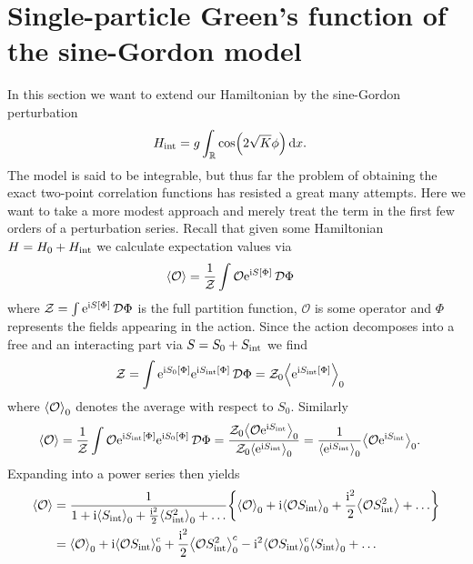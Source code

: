 \documentclass[english, parskip=full]{scrartcl}
\begin{document}
\section{Single-particle Green's function of the sine-Gordon model}
In this section we want to extend our Hamiltonian by the sine-Gordon perturbation
\begin{align}
H_\Text{int} &= g\intr{\cos\kla*{2\sqrt{K} \phi}}{x}.
\end{align}
The model is said to be integrable, but thus far the problem of obtaining the exact two-point correlation functions has resisted a great many attempts.
Here we want to take a more modest approach and merely treat the term in the first few orders of a perturbation series.
Recall that given some Hamiltonian $H=H_0+H_\Text{int}$ we calculate expectation values via
\begin{align}
\bra*{\mathcal{O}} &= \frac{1}{\mathcal{Z}} \int \mathcal{O} \powe{\i S[\Phi]}\,\mathcal{D}\Phi
\end{align} 
where $\mathcal{Z} = \int \powe{\i S[\Phi]}\,\mathcal{D}\Phi$ is the full partition function, $\mathcal{O}$ is some operator and $\Phi$ represents the fields appearing in the action.
Since the action decomposes into  a free and an interacting part via $S=S_0 + S_\Text{int}$ we find
\begin{align}
\mathcal{Z} &= \int \powe{\i S_0[\Phi]} \powe{\i S_\Text{int}[\Phi]}\,\mathcal{D}\Phi = \mathcal{Z}_0 \bra*{\powe{\i S_\Text{int}[\Phi]}}_0
\end{align}
where $\bra*{\mathcal{O}}_0$ denotes the average with respect to $S_0$.
Similarly
\begin{align}
\bra*{\mathcal{O}} &= \frac{1}{\mathcal{Z}}\int \mathcal{O} \powe{\i S_\Text{int}[\Phi]} \powe{\i S_0[\Phi]} \,\mathcal{D}\Phi = \frac{\mathcal{Z}_0 \bra*{\mathcal{O}\powe{\i S_\Text{int}}}_0}{\mathcal{Z}_0 \bra*{\powe{\i S_\Text{int}}}_0} = \frac{1}{\bra*{\powe{\i S_\Text{int}}}_0} \bra*{\mathcal{O}\powe{\i S_\Text{int}}}_0.
\end{align}
Expanding into a power series then yields
\begin{align}
\bra*{\mathcal{O}} &= \frac{1}{1 + \i \bra*{S_\Text{int}}_0 + \frac{\i^2}{2} \bra*{S_\Text{int}^2}_0 + \dots} \klc*{\bra*{\mathcal{O}}_0 + \i\bra*{\mathcal{O}S_\Text{int}}_0 + \frac{\i^2}{2} \bra*{\mathcal{O} S_\Text{int}^2} + \dots}\\
&= \bra*{\mathcal{O}}_0 + \i\bra*{\mathcal{O}S_\Text{int}}_0^c + \frac{\i^2}{2} \bra*{\mathcal{O}S_\Text{int}^2}_0^c - \i^2 \bra*{\mathcal{O}S_\Text{int}}_0^c \bra*{S_\Text{int}}_0 + \dots
\end{align}
\end{document}
